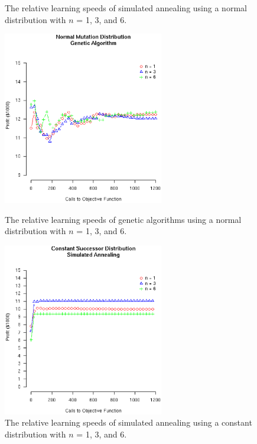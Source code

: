 \documentclass[12pt]{article}
\begin{document}
\begin{figure}[!ht]
\begin{minipage}[b]{0.5\linewidth}
    \caption{The relative learning speeds of simulated annealing using a normal
      distribution with $n$ = 1, 3, and 6.}
  \end{minipage}
\hspace{0.5cm} %
  \begin{minipage}[b]{0.5\linewidth}
    \center
    \includegraphics[width=7.0cm]{GenNORMALDist.eps}
    \caption{The relative learning speeds of genetic algorithms using a normal
      distribution with $n$ = 1, 3, and 6.}
  \end{minipage}
  \begin{minipage}[b]{0.5\linewidth}
    \center
    \includegraphics[width=7.0cm]{SimCONSTANTDist.eps}
    \caption{The relative learning speeds of simulated annealing using a
      constant distribution with $n$ = 1, 3, and 6.}
  \end{minipage}
\hspace{0.5cm} %
  \begin{minipage}[b]{0.5\linewidth}
    \center

\end{minipage}
\end{figure}
\end{document}
